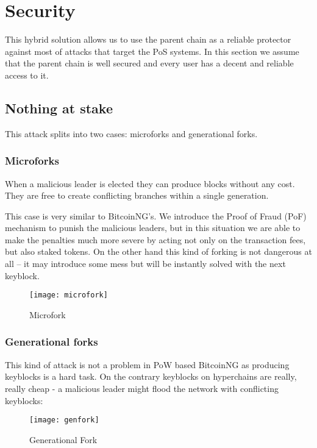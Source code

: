 \section{Security}

This hybrid solution allows us to use the parent chain as a
reliable protector against most of attacks that target the PoS systems.
\cite{pos_attacks}
In this section we assume that the parent chain is well secured and every
user has a decent and reliable access to it.

\subsection{Nothing at stake}

This attack splits into two cases: microforks and generational forks.

\subsubsection{Microforks}

When a malicious leader is elected they can produce blocks without any cost.
They are free to create conflicting branches within a single generation.

This case is very similar to BitcoinNG's. We introduce the Proof of Fraud (PoF)
mechanism to punish the malicious leaders, but in this situation we are able to
make the penalties much more severe by acting not only on the transaction fees,
but also staked tokens. On the other hand this kind of forking is
not dangerous at all – it may introduce some mess but will be instantly solved
with the next keyblock.

\begin{figure}[h]
	\caption{Microfork}
	\centering
	\texttt{[image: microfork]}
\end{figure}

\subsubsection{Generational forks}

This kind of attack is not a problem in PoW based BitcoinNG as producing
keyblocks is a hard task. On the contrary keyblocks on hyperchains are really,
really cheap - a malicious leader might flood the network with conflicting
keyblocks:

\begin{figure}[h]
	\caption{Generational Fork}
	\centering
	\texttt{[image: genfork]}
\end{figure}

